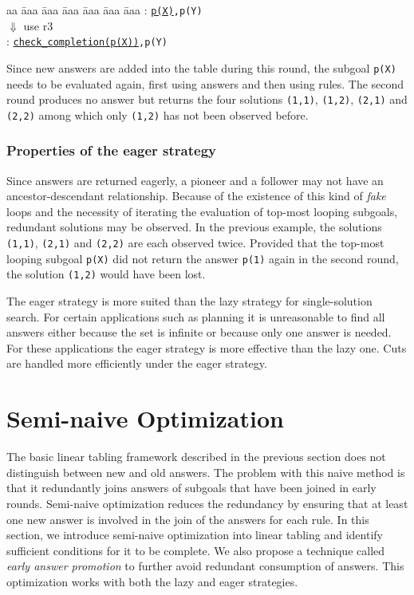 \documentclass{tlp}
\begin{document}
\begin{tabbing}
aa \= aaa \= aaa \= aaa \= aaa \= aaa \= aaa \kill
\> : {\tt \underline{p(X)},p(Y)} \\
\> \> \> $\Downarrow$ {\scriptsize use r3} \\
\> : {\tt \underline{check\_completion(p(X))},p(Y)} \\
\end{tabbing}      
Since new answers are added into the table during this round, the subgoal {\tt p(X)} needs to be evaluated again, first using answers and then using rules. The second round produces no answer but returns the four solutions {\tt (1,1)}, {\tt (1,2)}, {\tt (2,1)} and {\tt (2,2)} among which only {\tt (1,2)} has not been observed before.

\subsubsection{Properties of the eager strategy}
Since answers are returned eagerly, a pioneer and a follower may not have an ancestor-descendant relationship. Because of the existence of this kind of {\it fake} loops and the necessity of iterating the evaluation of top-most looping subgoals, redundant solutions may be observed. In the previous example, the solutions {\tt (1,1)}, {\tt (2,1)} and {\tt (2,2)} are each observed twice. Provided that the top-most looping subgoal {\tt p(X)} did not return the answer {\tt p(1)} again in the second round, the solution {\tt (1,2)} would have been lost.

The eager strategy is more suited than the lazy strategy for single-solution search. For certain applications such as planning it is unreasonable to find all answers either because the set is infinite or because only one answer is needed. For these applications the eager strategy is more effective than the lazy one. Cuts are handled more efficiently under the eager strategy.

\section{Semi-naive Optimization}
The basic linear tabling framework described in the previous section does not distinguish between new and old answers. The problem with this naive method is that it redundantly joins answers of subgoals that have been joined in early rounds. Semi-naive optimization \cite{Ullman88} reduces the redundancy by ensuring that at least one new answer is involved in the join of the answers for each rule. In this section, we introduce semi-naive optimization into linear tabling and identify sufficient conditions for it to be complete. We also propose a technique called {\it early answer promotion} to further avoid redundant consumption of answers. This optimization works with both the lazy and eager strategies.
\end{document}
